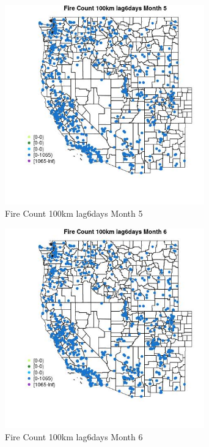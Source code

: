 \begin{figure} 
\centering  
\includegraphics[width=0.77\textwidth]{Code_Outputs/Report_ML_input_PM25_Step4_part_f_de_duplicated_aveswNAs_MapObsMo5Fire_Count_100km_lag6days.jpg} 
\caption{\label{fig:Report_ML_input_PM25_Step4_part_f_de_duplicated_aveswNAsMapObsMo5Fire_Count_100km_lag6days}Fire Count 100km lag6days Month 5} 
\end{figure} 
 

\clearpage 

\begin{figure} 
\centering  
\includegraphics[width=0.77\textwidth]{Code_Outputs/Report_ML_input_PM25_Step4_part_f_de_duplicated_aveswNAs_MapObsMo6Fire_Count_100km_lag6days.jpg} 
\caption{\label{fig:Report_ML_input_PM25_Step4_part_f_de_duplicated_aveswNAsMapObsMo6Fire_Count_100km_lag6days}Fire Count 100km lag6days Month 6} 
\end{figure} 
 

